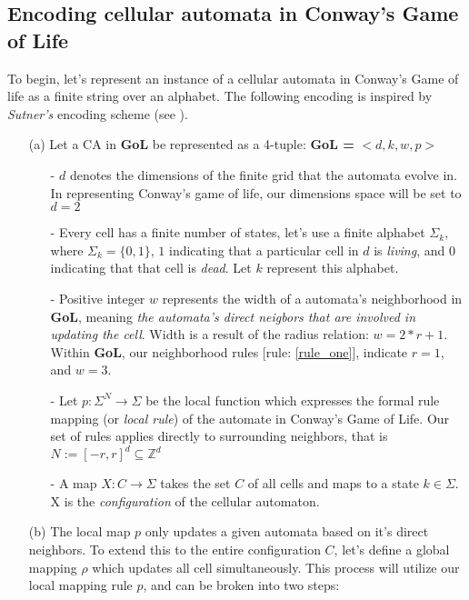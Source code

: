 \documentclass{article}
\theoremstyle{definition}
\theoremstyle{plain}
\theoremstyle{plain}
\begin{document}
\subsection{Encoding cellular automata in Conway's Game of Life}
To begin, let's represent an instance of a cellular automata in Conway's Game of life as a finite string over an alphabet. The following encoding is inspired by \textit{Sutner's} encoding scheme (see \cite{SUTNER199587}).
\begin{enumerate}
  \item[(a)] Let a CA in \textbf{GoL} be represented as a 4-tuple: \textbf{GoL = } $ <d, k, w, p> $
    \begin{enumerate}
      \item[-] $d$ denotes the dimensions of the finite grid that the automata evolve in. In representing Conway's game of life, our dimensions space will be set to $d = 2$
      \item[-] Every cell has a finite number of states, let's use a finite alphabet $\Sigma_k$, where $\Sigma_k = \{0,1\}$, $1$ indicating that a particular cell in $d$ is \textit{living}, and $0$ indicating that that cell is \textit{dead}. Let $k$ represent this alphabet.
      \item[-] Positive integer $w$ represents the width of a automata's neighborhood in \textbf{GoL}, meaning \textit{the automata's direct neigbors that are involved in updating the cell}. Width is a result of the radius relation: $w = 2*r +1$. Within \textbf{GoL}, our neighborhood rules [rule: \ref{rule_one}], indicate $r = 1$, and $w = 3$.
      \item[-] Let $p : \Sigma^N \to \Sigma$ be the local function which expresses the formal rule mapping (or \textit{local rule}) of the automate in Conway's Game of Life. Our set of rules applies directly to surrounding neighbors, that is$ N := [-r, r]^d \subseteq \mathbb{Z}^d $ 
      \item[-] A map $ X : C \to \Sigma $ takes the set $ C $ of all cells and maps to a state $ k \in \Sigma$. X is the \emph{configuration} of the cellular automaton.
    \end{enumerate}
      \item[(b)] The local map $p$ only updates a given automata based on it's direct neighbors. To extend this to the entire configuration $C$, let's define a global mapping $\rho$ which updates all cell simultaneously. This process will utilize our local mapping rule $p$, and  can be broken into two steps: 
        \begin{enumerate}

\end{enumerate}
\end{enumerate}
\end{document}
